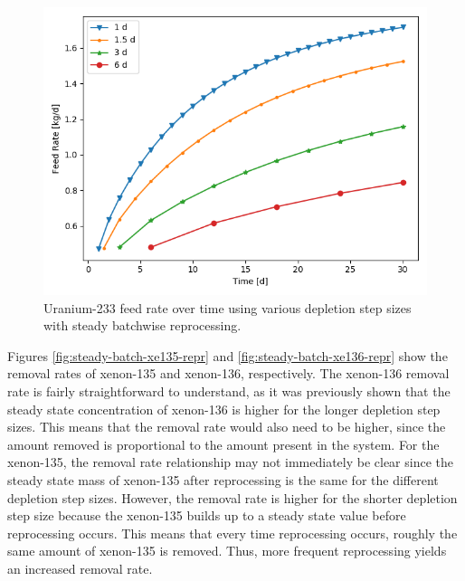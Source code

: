 \begin{figure}[H]
  \centering
  \includegraphics[scale=0.7]{images/feed_U233_6d_sp_comp.png}
  \caption{Uranium-233 feed rate over time using various depletion step sizes with steady batchwise reprocessing.}
   \label{fig:steady-batch-u-repr}
\end{figure}

Figures \ref{fig:steady-batch-xe135-repr} and \ref{fig:steady-batch-xe136-repr} show the removal rates of xenon-135 and xenon-136, respectively. The xenon-136 removal rate is fairly straightforward to understand, as it was previously shown that the steady state concentration of xenon-136 is higher for the longer depletion step sizes. This means that the removal rate would also need to be higher, since the amount removed is proportional to the amount present in the system. For the xenon-135, the removal rate relationship may not immediately be clear since the steady state mass of xenon-135 after reprocessing is the same for the different depletion step sizes. However, the removal rate is higher for the shorter depletion step size because the xenon-135 builds up to a steady state value before reprocessing occurs. This means that every time reprocessing occurs, roughly the same amount of xenon-135 is removed. Thus, more frequent reprocessing yields an increased removal rate.

